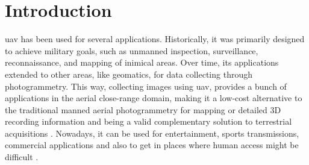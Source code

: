 \chapter[Introduction]{Introduction}\label{cha:intro}

\gls{uav} has been used for several applications. 
Historically, it was primarily designed to achieve military goals, such as unmanned inspection, surveillance, reconnaissance, and mapping of inimical areas.
Over time, its applications extended to other areas, like geomatics, for data collecting through photogrammetry. 
This way, collecting images using \gls{uav}, provides a bunch of applications in the aerial close-range domain, making it a low-cost alternative to the traditional manned aerial photogrammetry for mapping or detailed 3D recording information and being a valid complementary solution to terrestrial acquisitions \cite{nex2014uav}.
Nowadays, it can be used for entertainment, sports transmissions, commercial applications and also to get in places where human access might be difficult \cite{sushant2017localization}.